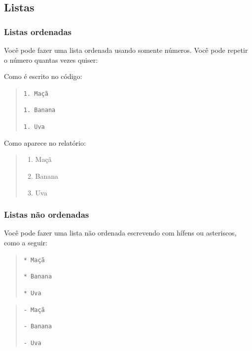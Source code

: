 \documentclass[
]{book}
\providecommand{\tightlist}{%
  \setlength{\itemsep}{0pt}\setlength{\parskip}{0pt}}
\begin{document}
\hypertarget{listas-1}{%
\subsection{Listas}\label{listas-1}}

\hypertarget{listas-ordenadas}{%
\subsubsection*{Listas ordenadas}\label{listas-ordenadas}}

Você pode fazer uma lista ordenada usando somente números. Você pode repetir o número quantas vezes quiser:

Como é escrito no código:

\begin{quote}
\texttt{1.\ Maçã}

\texttt{1.\ Banana}

\texttt{1.\ Uva}
\end{quote}

Como aparece no relatório:

\begin{quote}
\begin{enumerate}
\def\labelenumi{\arabic{enumi}.}
\tightlist
\item
  Maçã
\item
  Banana
\item
  Uva
\end{enumerate}
\end{quote}

\hypertarget{listas-nuxe3o-ordenadas}{%
\subsubsection*{Listas não ordenadas}\label{listas-nuxe3o-ordenadas}}

Você pode fazer uma lista não ordenada escrevendo com hífens ou asteriscos, como a seguir:

\begin{quote}
\texttt{*\ Maçã}

\texttt{*\ Banana}

\texttt{*\ Uva}
\end{quote}

\begin{quote}
\texttt{-\ Maçã}

\texttt{-\ Banana}

\texttt{-\ Uva}
\end{quote}
\end{document}
